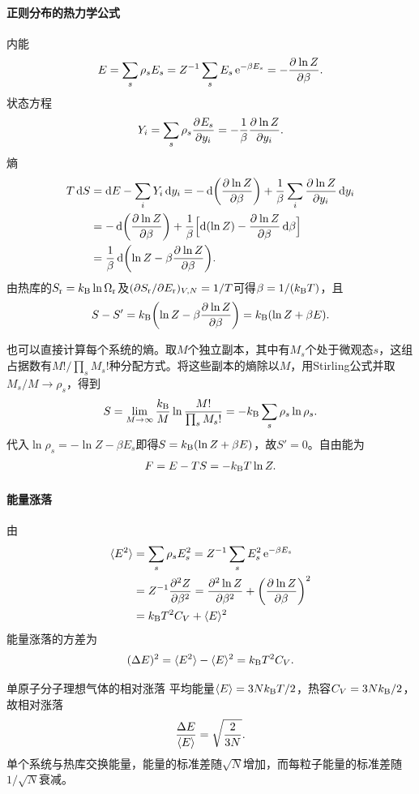 \paragraph{正则分布的热力学公式}内能
\begin{align}
	E = \sum_s\rho_s E_s = Z^{-1}\sum_s E_s\e^{-\beta E_s} = -\pv{\ln Z}\beta.
\end{align}
状态方程
\begin{align}
	Y_i = \sum_s\rho_s\pv{E_s}{y_i} = -\frac1\beta\pv{\ln Z}{y_i}.
\end{align}
熵
\begin{align*}
	T\d S &= \d E - \sum_i Y_i\d y_i = -\d\biggp{\pv{\ln Z}\beta} + \frac1\beta\sum_i\pv{\ln Z}{y_i}\d y_i\\
	&= -\d\biggp{\pv{\ln Z}\beta} + \frac1\beta\Bigb{\d(\ln Z) - \pv{\ln Z}\beta\d\beta}\\
	&= \frac1\beta\d\biggp{\ln Z - \beta\pv{\ln Z}\beta}.
\end{align*}
由热库的$S_\reservoir = \kB\ln\Omega_\reservoir$及$(\p S_\reservoir/\p E_\reservoir)_{V,N} = 1/T$可得$\beta = 1/(\kB T)$，且
\begin{align*}
	S - S' = \kB\biggp{\ln Z - \beta\pv{\ln Z}\beta} = \kB(\ln Z + \beta E).
\end{align*}

也可以直接计算每个系统的熵。取$M$个独立副本，其中有$M_s$个处于微观态$s$，这组占据数有$\textstyle M!/\prod_s M_s!$种分配方式。将这些副本的熵除以$M$，用Stirling公式并取$M_s/M \to \rho_s$，得到
\begin{align}
	S = \lim_{M\to\infty}\frac{\kB}{M}\ln\frac{M!}{\prod_s M_s!}
	= -\kB\sum_s\rho_s\ln\rho_s.
\end{align}
代入$\ln\rho_s = -\ln Z - \beta E_s$即得$S = \kB(\ln Z + \beta E)$，故$S' = 0$。自由能为
\begin{align}
	F = E - TS = -\kB T\ln Z.
\end{align}
\paragraph{能量涨落}由
\begin{align*}
	\ave{E^2} &= \sum_s\rho_s E_s^2 = Z^{-1}\sum_s E_s^2\e^{-\beta E_s}\\
	&= Z^{-1}\pv[2]Z\beta = \pv[2]{\ln Z}\beta + \biggp{\pv{\ln Z}\beta}^2\\
	&= \kB T^2C_V + \ave E^2
\end{align*}
能量涨落的方差为
\begin{align}
	(\Delta E)^2 = \ave{E^2} - \ave E^2 = \kB T^2C_V.
\end{align}
\begin{example}{单原子分子理想气体的相对涨落}{}
	平均能量$\ave E = 3N\kB T/2$，热容$C_V = 3N\kB/2$，故相对涨落
	\[
		\frac{\Delta E}{\ave E} = \sqrt{\frac2{3N}}.
	\]
	单个系统与热库交换能量，能量的标准差随$\sqrt N$增加，而每粒子能量的标准差随$1/\sqrt N$衰减。
\end{example}
